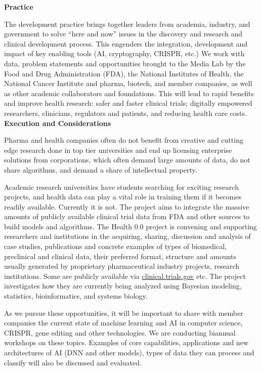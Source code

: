 \textbf{Practice}

The development practice brings together leaders from academia, industry, and government to solve ``here and now'' issues in the  discovery and research and clinical development process. This engenders the integration, development and impact of key enabling tools (AI, cryptography, CRISPR, etc.) We work with data, problem statements and opportunities brought to the Media Lab by the Food and Drug Administration (FDA), the National Institutes of Health, the National Cancer Institute and pharma, biotech, and member companies, as well as other academic collaborators and foundations. This will lead to rapid benefits and improve health research: safer and faster clinical trials; digitally empowered researchers, clinicians, regulators and patients, and reducing health care costs. \\

\textbf{Execution and Considerations}

Pharma and health companies often do not benefit from creative and cutting edge research done in top tier universities and end up licensing enterprise solutions from corporations, which often demand large amounts of data, do not share algorithms, and demand a share of intellectual property.

Academic research universities have students searching for exciting research projects, and health data can play a vital role in training them if it becomes readily available. Currently it is not. The project aims to integrate the massive amounts of publicly available clinical trial data from FDA and other sources to build models and algorithms. The Health 0.0 project is convening and supporting researchers and institutions in the acquiring, sharing, discussion and analysis of case studies, publications and concrete examples of types of biomedical, preclinical and clinical data, their preferred format, structure and amounts usually generated by proprietary pharmaceutical industry projects, research institutions. Some are publicly available via \href{https://clinicaltrials.gov/}{clinical.trials.gov} etc. The project investigates how they are currently being analyzed using Bayesian modeling, statistics, bioinformatics, and systems biology.

As we pursue these opportunities, it will be important to share with member companies the current state of machine learning and \ac{AI} in computer science, CRISPR, gene editing and other technologies. We are conducting biannual workshops on these topics. Examples of core capabilities, applications and new architectures of \ac{AI} (\ac{DNN} and other models), types of data they can process and classify will also be discussed and evaluated. \\

